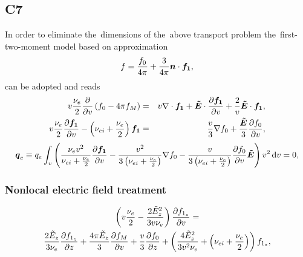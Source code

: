 \subsection{C7}
\label{sec:C7code}
In order to eliminate the~dimensions of the~above transport problem 
the~first-two-moment model based on approximation 
\begin{equation}
  f = \frac{f_0}{4\pi} + \frac{3}{4\pi}\boldsymbol{n}\cdot\boldsymbol{f_1} , 
  \nonumber \label{eq:OOE_P1approximation}
\end{equation}
can be adopted and reads
\begin{eqnarray}
  v\frac{\nu_{e}}{2}\frac{\partial{}}{\partial{v}}\left(f_0 - 4\pi f_M \right) &=&
  v\nabla\cdot\boldsymbol{f_1} + \boldsymbol{\tilde{E}}\cdot
  \frac{\partial{\boldsymbol{f_1}}}{\partial{v}} + \frac{2}{v}\boldsymbol{\tilde{E}}\cdot\boldsymbol{f_1} , 
  \nonumber \label{eq:OOE_P1f0}\\
  v\frac{\nu_{e}}{2}\frac{\partial{\boldsymbol{f_1}}}{\partial{v}}
  - \left(\nu_{ei} + \frac{\nu_{e}}{2}\right)\boldsymbol{f_1} &=& 
  \frac{v}{3}\nabla f_0 + 
  \frac{\boldsymbol{\tilde{E}}}{3}\frac{\partial{f_0}}{\partial{v}} ,
  \nonumber \label{eq:OOE_P1f1}
\end{eqnarray}
\begin{equation}
  \boldsymbol{q}_c \equiv
  q_e \int_{v} \left(\frac{\nu_{e}v^2}{\nu_{ei} + \frac{\nu_{e}}{2}}\frac{\partial{\boldsymbol{f_1}}}{\partial{v}}
  - \frac{v^2}{3\left(\nu_{ei} + \frac{\nu_{e}}{2}\right)}
  \nabla f_0 - 
  \frac{v}{3\left(\nu_{ei} + \frac{\nu_{e}}{2}\right)}\frac{\partial{f_0}}{\partial{v}}\boldsymbol{\tilde{E}}
  \right) v^2\, \text{d}v = 0
  , \nonumber
\end{equation}
\subsubsection{Nonlocal electric field treatment}
\label{sec:Efield}


\begin{multline}
  \left(v\frac{\nu_{e}}{2} - \frac{2\tilde{E}_z^2}{3v\nu_{e}}\right) 
  \frac{\partial{f_{1_z}}}{\partial{v}} 
  =\\
  \frac{2\tilde{E}_z}{3\nu_{e}}\frac{\partial{f_{1_z}}}{\partial{z}}  
  + \frac{4\pi\tilde{E}_z}{3}\frac{\partial{f_M}}{\partial{v}}
  + \frac{v}{3}\frac{\partial{f_0}}{\partial{z}} 
  + \left(\frac{4\tilde{E}_z^2}{3v^2\nu_{e}}
  + \left(\nu_{ei} + \frac{\nu_{e}}{2}\right) \right)f_{1_z}
  , \nonumber
\end{multline}


